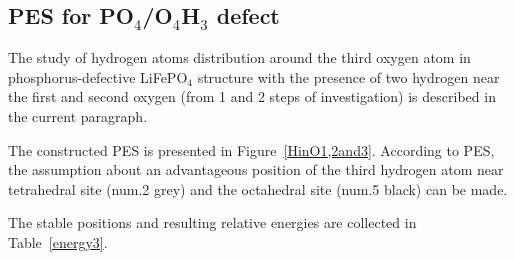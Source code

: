\subsection{PES for PO$_4$/O$_4$H$_3$ defect }
 
The study of hydrogen atoms distribution around the third oxygen atom in phosphorus-defective LiFePO$_{4}$ structure with the presence of two hydrogen near the first and second oxygen (from 1 and 2 steps of investigation) is described in the current paragraph.

The constructed PES is presented in Figure~\ref{HinO1,2and3}. According to PES, the assumption about an advantageous position of the third hydrogen atom near tetrahedral site (num.2 grey) and the octahedral site (num.5 black) can be made.

The stable positions and resulting relative energies are collected in Table~\ref{energy3}.

